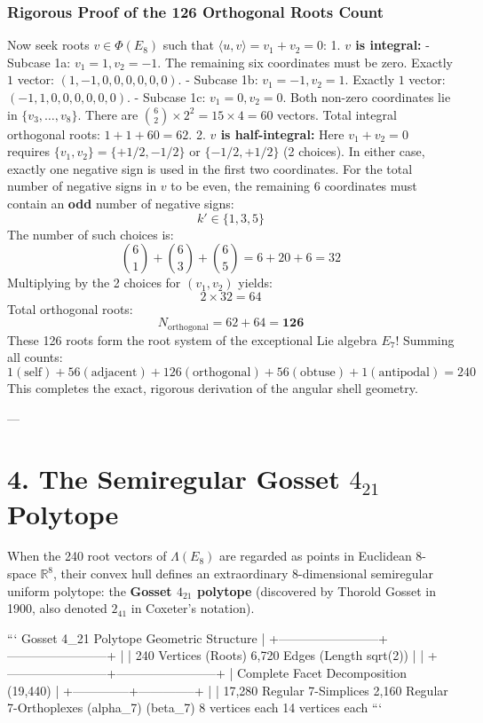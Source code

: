 \documentclass[11pt,twoside,openright]{amsbook}
\begin{document}
\subsubsection{Rigorous Proof of the 126 Orthogonal Roots Count}
Now seek roots $v \in \Phi(E_8)$ such that $\langle u, v \rangle = v_1 + v_2 = 0$:
1. \textbf{$v$ is integral:}
   - Subcase 1a: $v_1 = 1, v_2 = -1$. The remaining six coordinates must be zero. Exactly $1$ vector: $(1, -1, 0, 0, 0, 0, 0, 0)$.
   - Subcase 1b: $v_1 = -1, v_2 = 1$. Exactly $1$ vector: $(-1, 1, 0, 0, 0, 0, 0, 0)$.
   - Subcase 1c: $v_1 = 0, v_2 = 0$. Both non-zero coordinates lie in $\{v_3, \dots, v_8\}$. There are $\binom{6}{2} \times 2^2 = 15 \times 4 = 60$ vectors.
   Total integral orthogonal roots: $1 + 1 + 60 = 62$.
2. \textbf{$v$ is half-integral:}
   Here $v_1 + v_2 = 0$ requires $\{v_1, v_2\} = \{+1/2, -1/2\}$ or $\{-1/2, +1/2\}$ (2 choices).
   In either case, exactly one negative sign is used in the first two coordinates.
   For the total number of negative signs in $v$ to be even, the remaining 6 coordinates must contain an \textbf{odd} number of negative signs:
   $$k' \in \{1, 3, 5\}$$
   The number of such choices is:
   $$\binom{6}{1} + \binom{6}{3} + \binom{6}{5} = 6 + 20 + 6 = 32$$
   Multiplying by the 2 choices for $(v_1, v_2)$ yields:
   $$2 \times 32 = 64$$
Total orthogonal roots:
$$N_{\text{orthogonal}} = 62 + 64 = \mathbf{126}$$
These 126 roots form the root system of the exceptional Lie algebra $E_7$!
Summing all counts:
$$1 (\text{self}) + 56 (\text{adjacent}) + 126 (\text{orthogonal}) + 56 (\text{obtuse}) + 1 (\text{antipodal}) = 240$$
This completes the exact, rigorous derivation of the angular shell geometry.

---

\section{4. The Semiregular Gosset $4_{21}$ Polytope}

When the 240 root vectors of $\Lambda(E_8)$ are regarded as points in Euclidean 8-space $\mathbb{R}^8$, their convex hull defines an extraordinary 8-dimensional semiregular uniform polytope: the \textbf{Gosset $4_{21}$ polytope} (discovered by Thorold Gosset in 1900, also denoted $2_{41}$ in Coxeter's notation).

```
          Gosset 4_21 Polytope Geometric Structure
                             |
    +------------------------+------------------------+
    |                                                 |
240 Vertices (Roots)                            6,720 Edges (Length sqrt(2))
    |                                                 |
    +------------------------+------------------------+
                             |
              Complete Facet Decomposition (19,440)
                             |
              +--------------+--------------+
              |                             |
     17,280 Regular 7-Simplices    2,160 Regular 7-Orthoplexes
             (alpha_7)                     (beta_7)
          8 vertices each              14 vertices each
```
\end{document}
